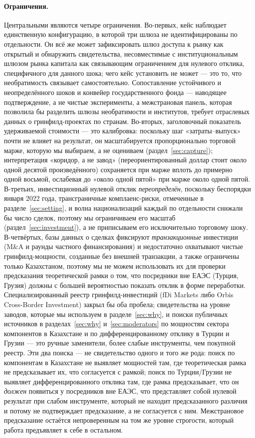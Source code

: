 \documentclass[12pt]{article}
\begin{document}
\paragraph{Ограничения.} Центральными являются четыре ограничения. Во-первых, кейс наблюдает
единственную конфигурацию, в которой три шлюза не идентифицированы по отдельности. Он всё
же может зафиксировать шлюз доступа к рынку как открытый и обнаружить свидетельства,
несовместимые с институциональным шлюзом рынка капитала как связывающим ограничением для
нулевого отклика, специфичного для данного шока; чего кейс установить не может — это то,
что необратимость связывает самостоятельно. Сопоставление устойчивого и неопределённого
шоков и конвейер государственного фонда — наводящее подтверждение, а не чистые эксперименты,
а межстрановая панель, которая позволила бы разделить шлюзы необратимости и институтов,
требует отраслевых данных о гринфилд-проектах по странам. Во-вторых, заголовочный показатель
удерживаемой стоимости — это калибровка: поскольку шаг «затраты--выпуск» почти не влияет на
результат, он масштабируется пропорционально торговой марже, которую мы выбираем, а не
оцениваем (раздел~\ref{sec:capture}); интерпретация «коридор, а не завод» (переориентированный
доллар стоит около одной десятой произведённого) сохраняется при марже вплоть до примерно
одной восьмой, ослабевая до «около одной пятой» при марже около одной пятой. В-третьих,
инвестиционный нулевой отклик \emph{переопределён}, поскольку беспорядки января 2022 года,
трансграничные комплаенс-риски, отмеченные в разделе~\ref{sec:setting}, и волна
национализаций каждый по отдельности снижали бы число сделок, поэтому мы ограничиваем его
масштаб (раздел~\ref{sec:investment}), а не приписываем его исключительно торговому шоку.
В-четвёртых, базы данных о сделках фиксируют \emph{транзакционные} инвестиции (M\&A и
раунды частного финансирования) и недостаточно охватывают чистые гринфилд-мощности,
созданные без внешней транзакции, а также ограничены только Казахстаном, поэтому мы не
можем использовать их для проверки предсказания теоретической рамки о том, что посредники
вне ЕАЭС (Турция, Грузия) должны с большей вероятностью показать отклик в форме переработки.
Специализированный реестр гринфилд-инвестиций (fDi Markets либо Orbis Cross-Border
Investment) закрыл бы оба пробела; свидетельства на уровне заводов, которые мы используем в
разделе~\ref{sec:why}, и поиски публичных источников в разделах~\ref{sec:why}
и~\ref{sec:moderators} по мощностям сектора компонентов в Казахстане и по дифференцированному
отклику в Турции и Грузии — это ручные заменители, более слабые инструменты, чем покупной
реестр. Эти два поиска — не свидетельство одного и того же рода: поиск по компонентам в
Казахстане не выявляет мощностей там, где теоретическая рамка не предсказывает их, что
согласуется с рамкой; поиск по Турции/Грузии не выявляет дифференцированного отклика там,
где рамка предсказывает, что он \emph{должен} появиться у посредников вне ЕАЭС, что
представляет собой нулевой результат при слабом инструменте, который не находит
предсказанного различия и потому не подтверждает предсказание, а не согласуется с ним.
Межстрановое предсказание остаётся непроверенным на том же уровне строгости, который работа
предъявляет к себе в остальном.
\end{document}
